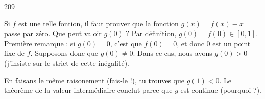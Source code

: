 

\begin{corrige}{209}

Si $f$ est une telle fontion, il faut prouver que la fonction $g(x)=f(x)-x$ passe par zéro. Que peut valoir $g(0)$ ? Par définition, $g(0)=f(0)\in[0,1]$. Première remarque : si $g(0)=0$, c'est que $f(0)=0$, et donc $0$ est un point fixe de $f$. Supposons donc que $g(0)\neq 0$. Dans ce cas, nous avons $g(0)>0$ (j'insiste sur le strict de cette inégalité).

En faisans le même raisonement (fais-le !), tu trouves que $g(1)<0$. Le théorème de la valeur intermédiaire conclut parce que $g$ est continue (pourquoi ?).

\end{corrige}
